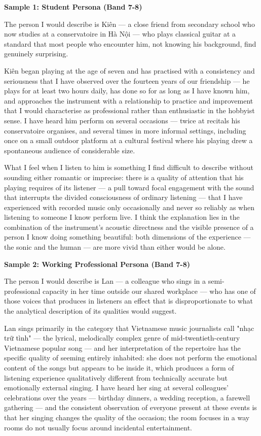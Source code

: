 \begin{ieltsanswer}
\textbf{Sample 1: Student Persona (Band 7-8)}

The person I would describe is Kiên — a close friend from secondary school who now studies at a conservatoire in Hà Nội — who plays classical guitar at a standard that most people who encounter him, not knowing his background, find genuinely surprising.

Kiên began playing at the age of seven and has practised with a consistency and seriousness that I have observed over the fourteen years of our friendship — he plays for at least two hours daily, has done so for as long as I have known him, and approaches the instrument with a relationship to practice and improvement that I would characterise as professional rather than enthusiastic in the hobbyist sense. I have heard him perform on several occasions — twice at recitals his conservatoire organises, and several times in more informal settings, including once on a small outdoor platform at a cultural festival where his playing drew a spontaneous audience of considerable size.

What I feel when I listen to him is something I find difficult to describe without sounding either romantic or imprecise: there is a quality of attention that his playing requires of its listener — a pull toward focal engagement with the sound that interrupts the divided consciousness of ordinary listening — that I have experienced with recorded music only occasionally and never so reliably as when listening to someone I know perform live. I think the explanation lies in the combination of the instrument's acoustic directness and the visible presence of a person I know doing something beautiful: both dimensions of the experience — the sonic and the human — are more vivid than either would be alone.

\textbf{Sample 2: Working Professional Persona (Band 7-8)}

The person I would describe is Lan — a colleague who sings in a semi-professional capacity in her time outside our shared workplace — who has one of those voices that produces in listeners an effect that is disproportionate to what the analytical description of its qualities would suggest.

Lan sings primarily in the category that Vietnamese music journalists call "nhạc trữ tình" — the lyrical, melodically complex genre of mid-twentieth-century Vietnamese popular song — and her interpretation of the repertoire has the specific quality of seeming entirely inhabited: she does not perform the emotional content of the songs but appears to be inside it, which produces a form of listening experience qualitatively different from technically accurate but emotionally external singing. I have heard her sing at several colleagues' celebrations over the years — birthday dinners, a wedding reception, a farewell gathering — and the consistent observation of everyone present at these events is that her singing changes the quality of the occasion; the room focuses in a way rooms do not usually focus around incidental entertainment.


\end{ieltsanswer}
